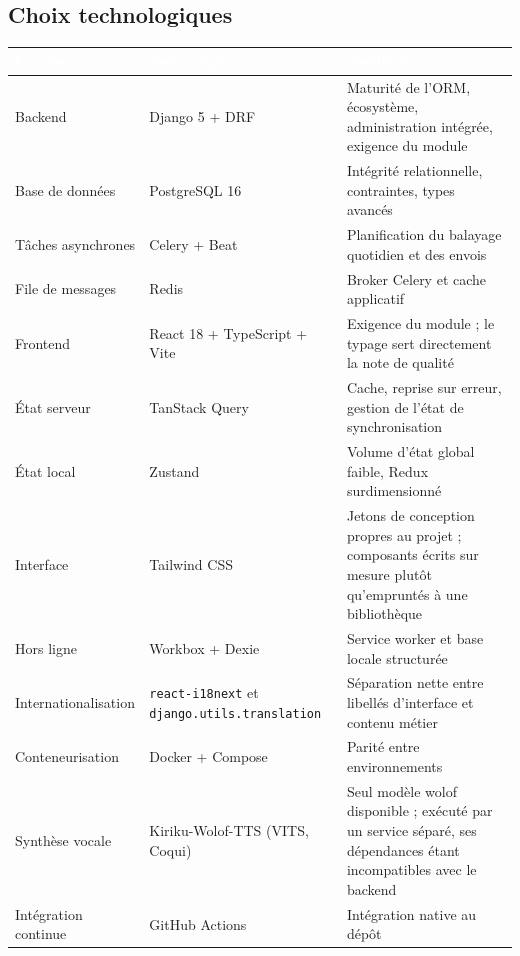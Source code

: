 \documentclass[11pt,a4paper]{article}
\newcommand{\hd}[1]{\textcolor{white}{\sffamily\bfseries\small #1}}
\newcommand{\rowhead}{\rowcolor{primary}}
\begin{document}
\begin{center}
\end{center}

\subsection{Choix technologiques}

\begin{xltabular}{\textwidth}{@{}R{2.8cm} R{4.3cm} L@{}}
\toprule
\rowhead \hd{Couche} & \hd{Technologie} & \hd{Justification} \\
\midrule \endhead
Backend & Django 5 + DRF & Maturité de l'ORM, écosystème, administration intégrée, exigence du module \\
Base de données & PostgreSQL 16 & Intégrité relationnelle, contraintes, types avancés \\
Tâches asynchrones & Celery + Beat & Planification du balayage quotidien et des envois \\
File de messages & Redis & Broker Celery et cache applicatif \\
Frontend & React 18 + TypeScript + Vite & Exigence du module ; le typage sert directement la note de qualité \\
État serveur & TanStack Query & Cache, reprise sur erreur, gestion de l'état de synchronisation \\
État local & Zustand & Volume d'état global faible, Redux surdimensionné \\
Interface & Tailwind CSS & Jetons de conception propres au projet ; composants écrits sur mesure plutôt qu'empruntés à une bibliothèque \\
Hors ligne & Workbox + Dexie & Service worker et base locale structurée \\
Internationalisation & \texttt{react-i18next} et \texttt{django.utils.translation} & Séparation nette entre libellés d'interface et contenu métier \\
Conteneurisation & Docker + Compose & Parité entre environnements \\
Synthèse vocale & Kiriku-Wolof-TTS (VITS, Coqui) & Seul modèle wolof disponible ; exécuté par un service séparé, ses dépendances étant incompatibles avec le backend \\
Intégration continue & GitHub Actions & Intégration native au dépôt \\
\bottomrule
\end{xltabular}
\end{document}

